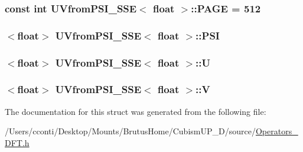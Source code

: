 \subsubsection[{P\+A\+G\+E}]{\setlength{\rightskip}{0pt plus 5cm}const int {\bf U\+Vfrom\+P\+S\+I\+\_\+\+S\+S\+E}$<$ float $>$\+::P\+A\+G\+E = 512\hspace{0.3cm}{\ttfamily [static]}}\label{struct_u_vfrom_p_s_i___s_s_e_3_01float_01_4_a0676bb743f7fca184c9b78ba95b38130}
\hypertarget{struct_u_vfrom_p_s_i___s_s_e_3_01float_01_4_abc94af3bcf4d3d119bcc0290484ead90}{}
\subsubsection[{P\+S\+I}]{$<$float$>$ {\bf U\+Vfrom\+P\+S\+I\+\_\+\+S\+S\+E}$<$ float $>$\+::P\+S\+I}\label{struct_u_vfrom_p_s_i___s_s_e_3_01float_01_4_abc94af3bcf4d3d119bcc0290484ead90}
\hypertarget{struct_u_vfrom_p_s_i___s_s_e_3_01float_01_4_aabb930a81564e88a23524891da5f45a9}{}
\subsubsection[{U}]{$<$float$>$ {\bf U\+Vfrom\+P\+S\+I\+\_\+\+S\+S\+E}$<$ float $>$\+::U}\label{struct_u_vfrom_p_s_i___s_s_e_3_01float_01_4_aabb930a81564e88a23524891da5f45a9}
\hypertarget{struct_u_vfrom_p_s_i___s_s_e_3_01float_01_4_a377c8c663c9d5a4552f9fa943fbfd826}{}
\subsubsection[{V}]{$<$float$>$ {\bf U\+Vfrom\+P\+S\+I\+\_\+\+S\+S\+E}$<$ float $>$\+::V}\label{struct_u_vfrom_p_s_i___s_s_e_3_01float_01_4_a377c8c663c9d5a4552f9fa943fbfd826}


The documentation for this struct was generated from the following file\+:\begin{DoxyCompactItemize}
\item 
/\+Users/cconti/\+Desktop/\+Mounts/\+Brutus\+Home/\+Cubism\+U\+P\+\_\+D/source/\hyperlink{_operators___d_f_t_8h}{Operators\+\_\+\+D\+F\+T.\+h}\end{DoxyCompactItemize}
